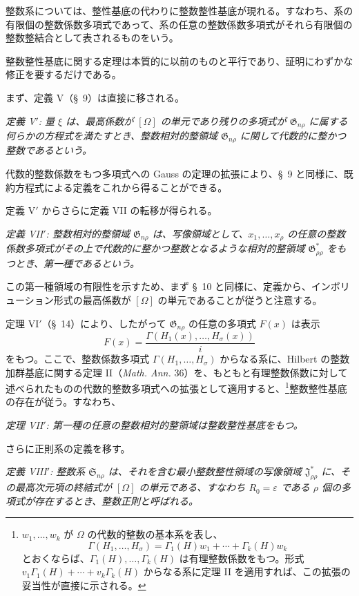 \documentclass[11pt]{jlreq}
\providecommand{\Ssys}{\mathfrak{S}}
\providecommand{\Jdom}{\mathfrak{J}}
\providecommand{\Gdom}{\mathfrak{G}}
\providecommand{\eps}{\varepsilon}
\begin{document}
整数系については、整性基底の代わりに整数整性基底が現れる。すなわち、系の有限個の整数係数多項式であって、系の任意の整数係数多項式がそれら有限個の整数整結合として表されるものをいう。

整数整性基底に関する定理は本質的に以前のものと平行であり、証明にわずかな修正を要するだけである。

まず、定義 V（\S\ 9）は直接に移される。

\emph{定義 V$'$: 量 $\xi$ は、最高係数が $[\Omega]$ の単元であり残りの多項式が $\Gdom_{n\rho}$ に属する何らかの方程式を満たすとき、整数相対的整領域 $\Gdom_{n\rho}$ に関して代数的に整かつ整数であるという。}

代数的整数係数をもつ多項式への Gauss の定理の拡張により、\S\ 9 と同様に、既約方程式による定義をこれから得ることができる。

定義 V$'$ からさらに定義 VII の転移が得られる。

\emph{定義 VII$'$: 整数相対的整領域 $\Gdom_{n\rho}$ は、写像領域として、$x_1,\ldots,x_\rho$ の任意の整数係数多項式がその上で代数的に整かつ整数となるような相対的整領域 $\Gdom^*_{\rho\rho}$ をもつとき、第一種であるという。}

この第一種領域の有限性を示すため、まず \S\ 10 と同様に、定義から、インボリューション形式の最高係数が $[\Omega]$ の単元であることが従うと注意する。

定理 VI$'$（\S\ 14）により、したがって $\Gdom_{n\rho}$ の任意の多項式 $F(x)$ は表示
\[
  F(x)=\frac{\Gamma(H_1(x),\ldots,H_\sigma(x))}{i}
\]
をもつ。ここで、整数係数多項式 $\Gamma(H_1,\ldots,H_\sigma)$ からなる系に、Hilbert の整数加群基底に関する定理 II（\emph{Math. Ann.} 36）を、もともと有理整数係数に対して述べられたものの代数的整数多項式への拡張として適用すると、\footnote{$w_1,\ldots,w_k$ が $\Omega$ の代数的整数の基本系を表し、
\[
  \Gamma(H_1,
\ldots,H_\sigma)=\Gamma_1(H)w_1+\cdots+\Gamma_k(H)w_k
\]
とおくならば、$\Gamma_1(H),\ldots,\Gamma_k(H)$ は有理整数係数をもつ。形式 $v_1\Gamma_1(H)+\cdots+v_k\Gamma_k(H)$ からなる系に定理 II を適用すれば、この拡張の妥当性が直接に示される。}整数整性基底の存在が従う。すなわち、

\emph{定理 VII$'$: 第一種の任意の整数相対的整領域は整数整性基底をもつ。}

さらに正則系の定義を移す。

\emph{定義 VIII$'$: 整数系 $\Ssys_{n\rho}$ は、それを含む最小整数整性領域の写像領域 $\Jdom^*_{\rho\rho}$ に、その最高次元項の終結式が $[\Omega]$ の単元である、すなわち $R_0=\eps$ である $\rho$ 個の多項式が存在するとき、整数正則と呼ばれる。}
\end{document}
